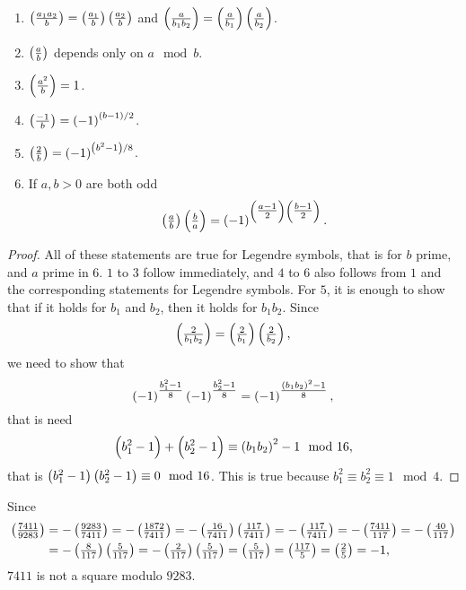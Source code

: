 
\begin{lemma}
\hfill
\begin{enumerate}
\item $ \jacobi{a_1a_2}{b} = \jacobi{a_1}{b}\jacobi{a_2}{b} $ and $ \jacobi{a}{b_1b_2} = \jacobi{a}{b_1}\jacobi{a}{b_2} $.
\item $ \jacobi{a}{b} $ depends only on $ a \mod b $.
\item $ \jacobi{a^2}{b} = 1 $.
\item $ \jacobi{-1}{b} = \br{-1}^{\br{b - 1} / 2} $.
\item $ \jacobi{2}{b} = \br{-1}^{\br{b^2 - 1} / 8} $.
\item If $ a, b > 0 $ are both odd
$$ \jacobi{a}{b}\jacobi{b}{a} = \br{-1}^{\br{\tfrac{a - 1}{2}}\br{\tfrac{b - 1}{2}}}. $$
\end{enumerate}
\end{lemma}

\begin{proof}
All of these statements are true for Legendre symbols, that is for $ b $ prime, and $ a $ prime in $ 6 $. $ 1 $ to $ 3 $ follow immediately, and $ 4 $ to $ 6 $ also follows from $ 1 $ and the corresponding statements for Legendre symbols. For $ 5 $, it is enough to show that if it holds for $ b_1 $ and $ b_2 $, then it holds for $ b_1b_2 $. Since
$$ \jacobi{2}{b_1b_2} = \jacobi{2}{b_1}\jacobi{2}{b_2}, $$
we need to show that
$$ \br{-1}^{\tfrac{b_1^2 - 1}{8}}\br{-1}^{\tfrac{b_2^2 - 1}{8}} = \br{-1}^{\tfrac{\br{b_1b_2}^2 - 1}{8}}, $$
that is need
$$ \br{b_1^2 - 1} + \br{b_2^2 - 1} \equiv \br{b_1b_2}^2 - 1 \mod 16, $$
that is $ \br{b_1^2 - 1}\br{b_2^2 - 1} \equiv 0 \mod 16 $. This is true because $ b_1^2 \equiv b_2^2 \equiv 1 \mod 4 $.
\end{proof}

\begin{example*}
Since
\begin{align*}
\jacobi{7411}{9283}
& = -\jacobi{9283}{7411} = -\jacobi{1872}{7411} = -\jacobi{16}{7411}\jacobi{117}{7411} = -\jacobi{117}{7411} = -\jacobi{7411}{117} = -\jacobi{40}{117} \\
& = -\jacobi{8}{117}\jacobi{5}{117} = -\jacobi{2}{117}\jacobi{5}{117} = \jacobi{5}{117} = \jacobi{117}{5} = \jacobi{2}{5} = -1,
\end{align*}
$ 7411 $ is not a square modulo $ 9283 $.
\end{example*}

\pagebreak

